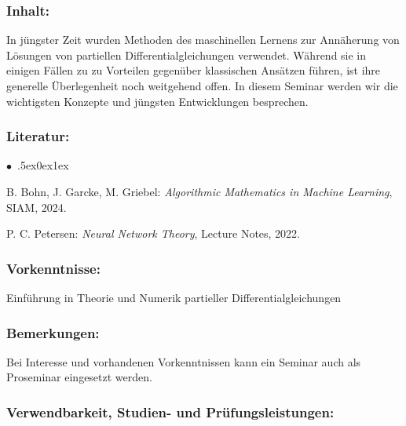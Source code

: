 \documentclass[a4paper,10pt]{article}
\renewenvironment{itemize}{\begin{list}{$\bullet$\ }{\itemsep.5ex\setlength{\topsep}{0.5\itemsep}\parsep0ex\labelsep1ex\settowidth{\labelwidth}{$\bullet$\ }\setlength{\leftmargin}{\labelwidth}\addtolength{\leftmargin}{3ex}\addtolength{\leftmargin}{\labelsep}}}{\end{list}}
\begin{document}
\subsubsection*{\large
    Inhalt:
}
In jüngster Zeit wurden Methoden des maschinellen Lernens zur Annäherung von Lösungen von partiellen Differentialgleichungen verwendet. Während sie in einigen Fällen zu zu Vorteilen gegenüber klassischen Ansätzen führen, ist ihre generelle Überlegenheit noch weitgehend offen. In diesem Seminar werden wir die wichtigsten Konzepte und jüngsten Entwicklungen besprechen.
\subsubsection*{\large
    Literatur:
}
\begin{itemize}
\item
B. Bohn, J. Garcke, M. Griebel: \emph{Algorithmic Mathematics in Machine Learning}, SIAM, 2024.
\item
P. C. Petersen: \emph{Neural Network Theory}, Lecture Notes, 2022. 
\end{itemize}
\subsubsection*{\large
    Vorkenntnisse:
}
Einführung in Theorie und Numerik partieller Differentialgleichungen
\subsubsection*{\large
    Bemerkungen:
}
Bei Interesse und vorhandenen Vorkenntnissen kann ein Seminar auch als Proseminar eingesetzt werden.
\subsubsection*{\large
    Verwendbarkeit, Studien- und Prüfungsleistungen:
}
\end{document}
